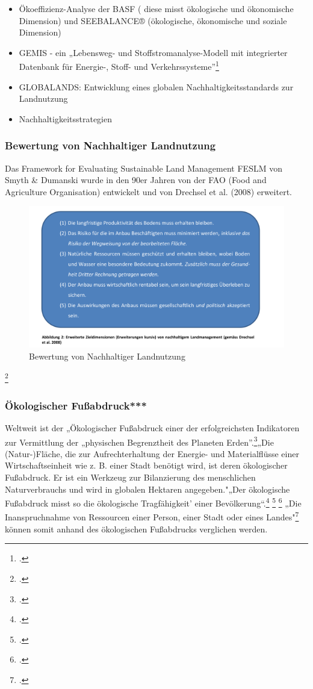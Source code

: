 \documentclass{scrartcl}
\begin{document}
\begin{itemize}
\item Ökoeffizienz-Analyse der BASF ( diese misst ökologische und ökonomische Dimension) und SEEBALANCE® (ökologische, ökonomische und soziale Dimension)
\item GEMIS - ein „Lebensweg- und Stoffstromanalyse-Modell mit integrierter Datenbank für Energie-, Stoff- und Verkehrssysteme”\footcite{}
\item GLOBALANDS: Entwicklung eines globalen Nachhaltigkeitsstandards zur Landnutzung
\item Nachhaltigkeitsstrategien
\end{itemize}

\subsubsection{Bewertung von Nachhaltiger Landnutzung}
Das Framework for Evaluating Sustainable Land Management FESLM von Smyth \& Dumanski wurde in den 90er Jahren von der FAO (Food and Agriculture Organisation) entwickelt und von Drechsel et al. (2008) erweitert.
\begin{figure}[htbp]
\centering
\includegraphics[width=12cm]{image_folder/drechsel.png}
\caption{Bewertung von Nachhaltiger Landnutzung}
\label{fig:Bewertung von Nachhaltiger Landnutzung}
\end{figure}\footcite{Spring2012DerBasel-Stadt, S.17}

\subsubsection{Ökologischer Fußabdruck***}
Weltweit ist der „Ökologischer Fußabdruck einer der erfolgreichsten Indikatoren zur Vermittlung der „physischen Begrenztheit des Planeten Erden”.\footcite[S.2]{StefanGiljum2007WissenschaftlicheFuabdruck}„Die (Natur-)Fläche, die zur Aufrechterhaltung der Energie- und Materialflüsse einer Wirtschaftseinheit wie z. B. einer Stadt benötigt wird, ist deren ökologischer Fußabdruck. Er ist ein Werkzeug zur Bilanzierung des menschlichen Naturverbrauchs und wird in globalen Hektaren angegeben."„Der ökologische Fußabdruck misst so die ökologische Tragfähigkeit’ einer Bevölkerung“.\footcite[S. 25]{MathisWackernagelUnserNimmt} \footcite[S.5]{MichelsenGrundlagenEntwicklung} 
\footcite[Vgl.][S.23ff]{MathisWackernagelUnserNimmt}
„Die Inanspruchnahme von Ressourcen einer Person, einer Stadt oder eines Landes"\footcite[S.192]{AntjeFlade2015StadtStadtforschung} können somit anhand des ökologischen Fußabdrucks verglichen werden. 
\end{document}
